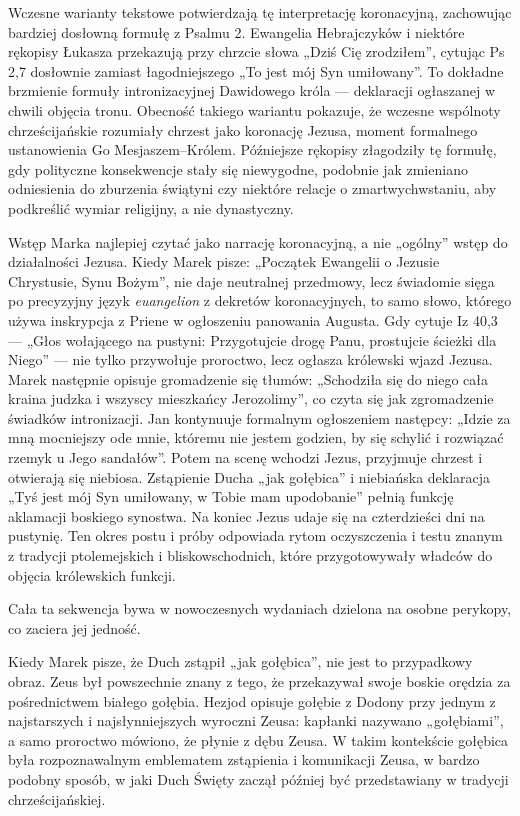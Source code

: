 Wczesne warianty tekstowe potwierdzają tę interpretację koronacyjną, zachowując bardziej dosłowną formułę z Psalmu 2.
Ewangelia Hebrajczyków i niektóre rękopisy Łukasza przekazują przy chrzcie słowa „Dziś Cię zrodziłem”, cytując Ps 2,7 dosłownie zamiast łagodniejszego „To jest mój Syn umiłowany”.
To dokładne brzmienie formuły intronizacyjnej Dawidowego króla — deklaracji ogłaszanej w chwili objęcia tronu.
Obecność takiego wariantu pokazuje, że wczesne wspólnoty chrześcijańskie rozumiały chrzest jako koronację Jezusa, moment formalnego ustanowienia Go Mesjaszem–Królem.
Późniejsze rękopisy złagodziły tę formułę, gdy polityczne konsekwencje stały się niewygodne, podobnie jak zmieniano odniesienia do zburzenia świątyni czy niektóre relacje o zmartwychwstaniu, aby podkreślić wymiar religijny, a nie dynastyczny.

Wstęp Marka najlepiej czytać jako narrację koronacyjną, a nie „ogólny” wstęp do działalności Jezusa.
Kiedy Marek pisze: „Początek Ewangelii o Jezusie Chrystusie, Synu Bożym”, nie daje neutralnej przedmowy, lecz świadomie sięga po precyzyjny język \textit{euangelion} z dekretów koronacyjnych, to samo słowo, którego używa inskrypcja z Priene w ogłoszeniu panowania Augusta.
Gdy cytuje Iz 40,3 — „Głos wołającego na pustyni: Przygotujcie drogę Panu, prostujcie ścieżki dla Niego” — nie tylko przywołuje proroctwo, lecz ogłasza królewski wjazd Jezusa.
Marek następnie opisuje gromadzenie się tłumów: „Schodziła się do niego cała kraina judzka i wszyscy mieszkańcy Jerozolimy”, co czyta się jak zgromadzenie świadków intronizacji.
Jan kontynuuje formalnym ogłoszeniem następcy: „Idzie za mną mocniejszy ode mnie, któremu nie jestem godzien, by się schylić i rozwiązać rzemyk u Jego sandałów”.
Potem na scenę wchodzi Jezus, przyjmuje chrzest i otwierają się niebiosa.
Zstąpienie Ducha „jak gołębica” i niebiańska deklaracja „Tyś jest mój Syn umiłowany, w Tobie mam upodobanie” pełnią funkcję aklamacji boskiego synostwa.
Na koniec Jezus udaje się na czterdzieści dni na pustynię.
Ten okres postu i próby odpowiada rytom oczyszczenia i testu znanym z tradycji ptolemejskich i bliskowschodnich, które przygotowywały władców do objęcia królewskich funkcji.

Cała ta sekwencja bywa w nowoczesnych wydaniach dzielona na osobne perykopy, co zaciera jej jedność.

Kiedy Marek pisze, że Duch zstąpił „jak gołębica”, nie jest to przypadkowy obraz.
Zeus był powszechnie znany z tego, że przekazywał swoje boskie orędzia za pośrednictwem białego gołębia.
Hezjod opisuje gołębie z Dodony przy jednym z najstarszych i najsłynniejszych wyroczni Zeusa: kapłanki nazywano „gołębiami”, a samo proroctwo mówiono, że płynie z dębu Zeusa.
W takim kontekście gołębica była rozpoznawalnym emblematem zstąpienia i komunikacji Zeusa, w bardzo podobny sposób, w jaki Duch Święty zaczął później być przedstawiany w tradycji chrześcijańskiej.

